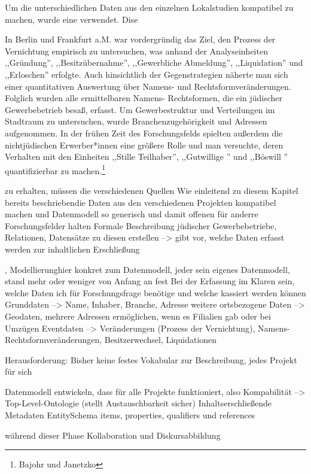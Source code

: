 Um die unterschiedlichen Daten aus den einzelnen Lokalstudien kompatibel zu machen, wurde eine  verwendet.  Dise 

In Berlin und Frankfurt a.M. war vordergründig das Ziel, den Prozess der Vernichtung empirisch zu untersuchen, was anhand der Analyseinheiten ,,Gründung'', ,,Besitzübernahme'', ,,Gewerbliche Abmeldung'', ,,Liquidation'' und ,,Erloschen'' erfolgte. Auch hinsichtlich der Gegenstrategien näherte man sich einer quantitativen Auswertung über Namens- und Rechtsformveränderungen. Folglich wurden alle ermittelbaren Namens- Rechtsformen, die ein jüdischer Gewerbebetrieb besaß, erfasst. Um Gewerbestruktur und Verteilungen im Stadtraum zu untersuchen, wurde Branchenzugehörigkeit und Adressen aufgenommen. In der frühen Zeit des Forschungsfelds spielten außerdem die nichtjüdischen Erwerber*innen eine größere Rolle und man versuchte, deren Verhalten mit den Einheiten ,,Stille Teilhaber'', ,,Gutwillige '' und ,,Böswill '' quantifizierbar zu machen.\footnote{Bajohr und Janetzko}



zu erhalten, müssen die verschiedenen Quellen Wie einleitend zu diesem Kapitel bereits beschriebendie Daten aus den verschiedenen Projekten kompatibel machen und Datenmodell so generisch und damit offenen für anderre Forschungsfelder halten
Formale Beschreibung jüdischer Gewerbebetriebe, Relationen, Datensätze zu diesen erstellen --> gibt vor, welche Daten erfasst werden zur inhaltlichen Erschließung


, Modellierunghier konkret zum Datenmodell, jeder sein eigenes Datenmodell, stand mehr oder weniger von Anfang an fest
Bei der Erfassung im Klaren sein, welche Daten ich für Forschungsfrage benötige und welche kassiert werden können
Grunddaten --> Name, Inhaber, Branche, Adresse
weitere ortsbezogene Daten --> Geodaten, mehrere Adressen ermöglichen, wenn es Filialien gab oder bei Umzügen
Eventdaten --> Veränderungen (Prozess der Vernichtung), Namens-Rechtsformveränderungen, Besitzerwechsel, Liquidationen

Herausforderung: Bisher keine festes Vokabular zur Beschreibung, jedes Projekt für sich 

Datenmodell entwickeln, dass für alle Projekte funktioniert, also 
Kompabilität --> Top-Level-Ontologie (stellt Austauschbarkeit sicher)
Inhaltserschließende Metadaten
EntitySchema items, properties, qualifiers und references

während dieser Phase Kollaboration und Diskursabbildung






